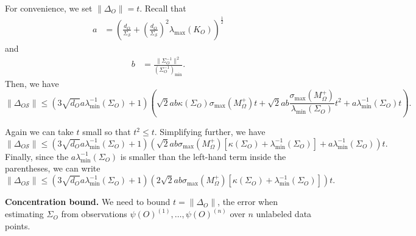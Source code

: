 \documentclass[letterpaper]{article}
\begin{document}
\begin{appendix}
For convenience, we set $\|\Delta_O\| = t$.
Recall that
\begin{align*}
	a
	&=
	\left( 
		\frac{d_O}{\Sigma_{\mathcal{S}}} 
		+ \left(\frac{d_O}{\Sigma_{\mathcal{S}}}\right)^2 \lambda_{\textrm{max}}(K_O)
	\right)^{\frac12}
\end{align*}
and
\begin{align*}
	b
	&=
	\frac{ \|\Sigma_O^{-1}\|^2}{(\Sigma_O^{-1})_{\min}}.
\end{align*}
Then, we have
 \[ \|\Delta_{O\mathcal{S}} \| \leq (3\sqrt{d_O}a \lambda_{\min}^{-1}(\Sigma_O)+1)\left(\sqrt{2}ab \kappa(\Sigma_O)  \sigma_{\max}(M_\Omega^+) t + \sqrt{2}ab \frac{ \sigma_{\max}(M_\Omega^+)}{  \lambda_{\min}(\Sigma_O)}t^2 + a   \lambda_{\min}^{-1}(\Sigma_O)t \right).\]

Again we can take $t$ small so that $t^2 \leq t$. Simplifying further, we have
\[ \|\Delta_{O\mathcal{S}} \| \leq (3\sqrt{d_O}a \lambda_{\min}^{-1}(\Sigma_O)+1)\left(\sqrt{2}ab \sigma_{\max}(M_\Omega^+) \left[ \kappa(\Sigma_O)   +\lambda_{\min}^{-1}(\Sigma_O)\right] + a   \lambda_{\min}^{-1}(\Sigma_O) \right)t.\]
Finally, since the $a\lambda_{\min}^{-1}(\Sigma_O)$ is smaller than the left-hand term inside the parentheses, we can write
\begin{equation}
\label{eq:tbound}
\|\Delta_{O\mathcal{S}} \| \leq (3\sqrt{d_O}a \lambda_{\min}^{-1}(\Sigma_O)+1)\left(2\sqrt{2}ab \sigma_{\max}(M_\Omega^+) \left[ \kappa(\Sigma_O)   +\lambda_{\min}^{-1}(\Sigma_O)\right] \right)t.
\end{equation}
 
{\bf Concentration bound.}
We need to bound $t = \|\Delta_O\|$, the error when estimating $\Sigma_O$ from observations $\psi(O)^{(1)}, \ldots, \psi(O)^{(n)}$  over $n$ unlabeled data points.


\end{appendix}
\end{document}
